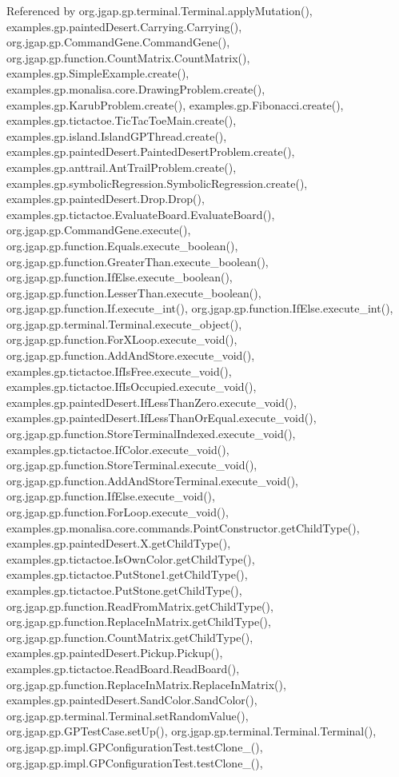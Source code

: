 Referenced by org.\-jgap.\-gp.\-terminal.\-Terminal.\-apply\-Mutation(), examples.\-gp.\-painted\-Desert.\-Carrying.\-Carrying(), org.\-jgap.\-gp.\-Command\-Gene.\-Command\-Gene(), org.\-jgap.\-gp.\-function.\-Count\-Matrix.\-Count\-Matrix(), examples.\-gp.\-Simple\-Example.\-create(), examples.\-gp.\-monalisa.\-core.\-Drawing\-Problem.\-create(), examples.\-gp.\-Karub\-Problem.\-create(), examples.\-gp.\-Fibonacci.\-create(), examples.\-gp.\-tictactoe.\-Tic\-Tac\-Toe\-Main.\-create(), examples.\-gp.\-island.\-Island\-G\-P\-Thread.\-create(), examples.\-gp.\-painted\-Desert.\-Painted\-Desert\-Problem.\-create(), examples.\-gp.\-anttrail.\-Ant\-Trail\-Problem.\-create(), examples.\-gp.\-symbolic\-Regression.\-Symbolic\-Regression.\-create(), examples.\-gp.\-painted\-Desert.\-Drop.\-Drop(), examples.\-gp.\-tictactoe.\-Evaluate\-Board.\-Evaluate\-Board(), org.\-jgap.\-gp.\-Command\-Gene.\-execute(), org.\-jgap.\-gp.\-function.\-Equals.\-execute\-\_\-boolean(), org.\-jgap.\-gp.\-function.\-Greater\-Than.\-execute\-\_\-boolean(), org.\-jgap.\-gp.\-function.\-If\-Else.\-execute\-\_\-boolean(), org.\-jgap.\-gp.\-function.\-Lesser\-Than.\-execute\-\_\-boolean(), org.\-jgap.\-gp.\-function.\-If.\-execute\-\_\-int(), org.\-jgap.\-gp.\-function.\-If\-Else.\-execute\-\_\-int(), org.\-jgap.\-gp.\-terminal.\-Terminal.\-execute\-\_\-object(), org.\-jgap.\-gp.\-function.\-For\-X\-Loop.\-execute\-\_\-void(), org.\-jgap.\-gp.\-function.\-Add\-And\-Store.\-execute\-\_\-void(), examples.\-gp.\-tictactoe.\-If\-Is\-Free.\-execute\-\_\-void(), examples.\-gp.\-tictactoe.\-If\-Is\-Occupied.\-execute\-\_\-void(), examples.\-gp.\-painted\-Desert.\-If\-Less\-Than\-Zero.\-execute\-\_\-void(), examples.\-gp.\-painted\-Desert.\-If\-Less\-Than\-Or\-Equal.\-execute\-\_\-void(), org.\-jgap.\-gp.\-function.\-Store\-Terminal\-Indexed.\-execute\-\_\-void(), examples.\-gp.\-tictactoe.\-If\-Color.\-execute\-\_\-void(), org.\-jgap.\-gp.\-function.\-Store\-Terminal.\-execute\-\_\-void(), org.\-jgap.\-gp.\-function.\-Add\-And\-Store\-Terminal.\-execute\-\_\-void(), org.\-jgap.\-gp.\-function.\-If\-Else.\-execute\-\_\-void(), org.\-jgap.\-gp.\-function.\-For\-Loop.\-execute\-\_\-void(), examples.\-gp.\-monalisa.\-core.\-commands.\-Point\-Constructor.\-get\-Child\-Type(), examples.\-gp.\-painted\-Desert.\-X.\-get\-Child\-Type(), examples.\-gp.\-tictactoe.\-Is\-Own\-Color.\-get\-Child\-Type(), examples.\-gp.\-tictactoe.\-Put\-Stone1.\-get\-Child\-Type(), examples.\-gp.\-tictactoe.\-Put\-Stone.\-get\-Child\-Type(), org.\-jgap.\-gp.\-function.\-Read\-From\-Matrix.\-get\-Child\-Type(), org.\-jgap.\-gp.\-function.\-Replace\-In\-Matrix.\-get\-Child\-Type(), org.\-jgap.\-gp.\-function.\-Count\-Matrix.\-get\-Child\-Type(), examples.\-gp.\-painted\-Desert.\-Pickup.\-Pickup(), examples.\-gp.\-tictactoe.\-Read\-Board.\-Read\-Board(), org.\-jgap.\-gp.\-function.\-Replace\-In\-Matrix.\-Replace\-In\-Matrix(), examples.\-gp.\-painted\-Desert.\-Sand\-Color.\-Sand\-Color(), org.\-jgap.\-gp.\-terminal.\-Terminal.\-set\-Random\-Value(), org.\-jgap.\-gp.\-G\-P\-Test\-Case.\-set\-Up(), org.\-jgap.\-gp.\-terminal.\-Terminal.\-Terminal(), org.\-jgap.\-gp.\-impl.\-G\-P\-Configuration\-Test.\-test\-Clone\-\_(), org.\-jgap.\-gp.\-impl.\-G\-P\-Configuration\-Test.\-test\-Clone\-\_(), 